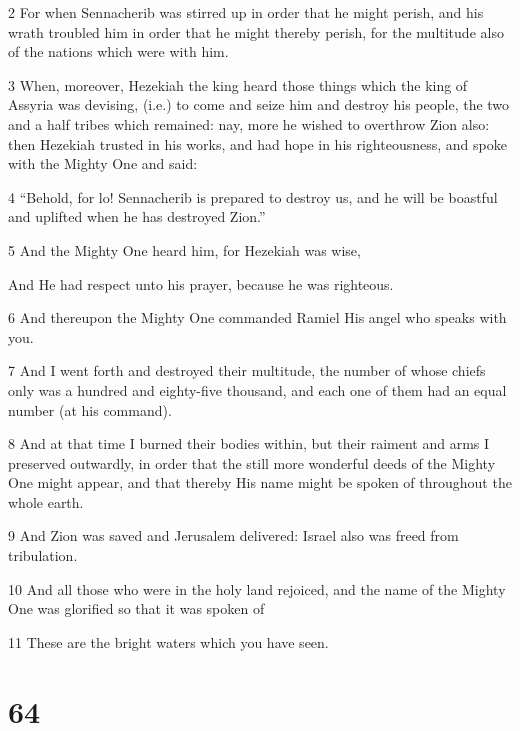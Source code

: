 \par 2 For when Sennacherib was stirred up in order that he might perish, and his wrath troubled him in order that he might thereby perish, for the multitude also of the nations which were with him. 

\par 3 When, moreover, Hezekiah the king heard those things which the king of Assyria was devising, (i.e.) to come and seize him and destroy his people, the two and a half tribes which remained: nay, more he wished to overthrow Zion also: then Hezekiah trusted in his works, and had hope in his righteousness, and spoke with the Mighty One and said: 

\par 4 “Behold, for lo! Sennacherib is prepared to destroy us, and he will be boastful and uplifted when he has destroyed Zion.”

\par 5 And the Mighty One heard him, for Hezekiah was wise,

\par And He had respect unto his prayer, because he was righteous.

\par 6 And thereupon the Mighty One commanded Ramiel His angel who speaks with you. 

\par 7 And I went forth and destroyed their multitude, the number of whose chiefs only was a hundred and eighty-five thousand, and each one of them had an equal number (at his command). 

\par 8 And at that time I burned their bodies within, but their raiment and arms I preserved outwardly, in order that the still more wonderful deeds of the Mighty One might appear, and that thereby His name might be spoken of throughout the whole earth. 

\par 9 And Zion was saved and Jerusalem delivered: Israel also was freed from tribulation. 

\par 10 And all those who were in the holy land rejoiced, and the name of the Mighty One was glorified so that it was spoken of 

\par 11 These are the bright waters which you have seen.

\chapter{64}

